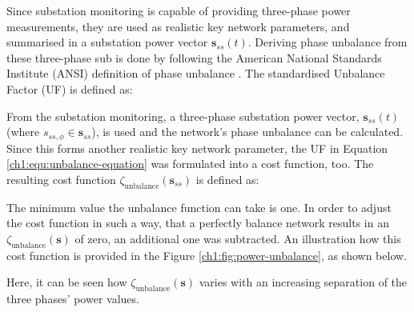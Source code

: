 

Since substation monitoring is capable of providing three-phase power measurements, they are used as realistic key network parameters, and summarised in a substation power vector $\textbf{s}_{ss}(t)$.
Deriving phase unbalance from these three-phase sub is done by following the American National Standards Institute (ANSI) definition of phase unbalance \cite{ANSI-MB-1-2011}.
The standardised Unbalance Factor (UF) is defined as:




From the substation monitoring, a three-phase substation power vector, $\textbf{s}_{ss}(t)$ (where $s_{ss,\phi} \in \textbf{s}_{ss}$), is used and the network's phase unbalance can be calculated.
Since this forms another realistic key network parameter, the UF in Equation \ref{ch1:equ:unbalance-equation} was formulated into a cost function, too.
The resulting cost function $\zeta_\text{unbalance}(\textbf{s}_{ss})$ is defined as:



The minimum value the unbalance function can take is one.
In order to adjust the cost function in such a way, that a perfectly balance network results in an $\zeta_\text{unbalance}(\textbf{s})$ of zero, an additional one was subtracted.
An illustration how this cost function is provided in the Figure \ref{ch1:fig:power-unbalance}, as shown below.



Here, it can be seen how $\zeta_\text{unbalance}(\textbf{s})$ varies with an increasing separation of the three phases' power values.


